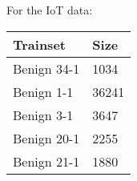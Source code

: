 \begin{background}
For the IoT data:
\begin{table}[!ht]
    \centering
    \begin{tabular}{|l|l|}
    \hline
        Trainset & Size \\ \hline
        Benign 34-1 & 1034 \\ \hline
        Benign 1-1 & 36241 \\ \hline
        Benign 3-1 & 3647 \\ \hline
        Benign 20-1 & 2255 \\ \hline
        Benign 21-1 & 1880 \\ \hline
    \end{tabular}
\end{table}






\end{background}
